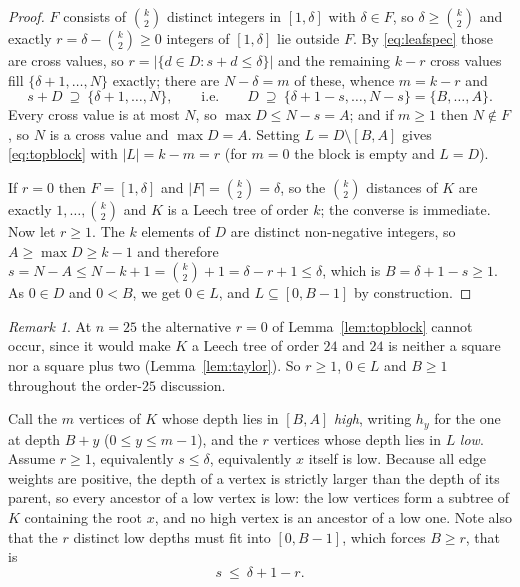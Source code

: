 \documentclass[11pt,a4paper]{article}
\theoremstyle{plain}
\theoremstyle{remark}
\newtheorem*{remark*}{Remark}
\newcommand{\bin}[2]{\binom{#1}{#2}}
\begin{document}
\begin{proof}
$F$ consists of $\bin k2$ distinct integers in $[1,\delta]$ with $\delta\in F$,
so $\delta\ge\bin k2$ and exactly $r=\delta-\bin k2\ge 0$ integers of $[1,\delta]$
lie outside $F$.  By \eqref{eq:leafspec} those are cross values, so
$r=|\{d\in D: s+d\le\delta\}|$ and the remaining $k-r$ cross values fill
$\{\delta+1,\dots,N\}$ exactly; there are $N-\delta=m$ of these, whence $m=k-r$
and
\[
  s+D\ \supseteq\ \{\delta+1,\dots,N\},\qquad\text{i.e.}\qquad
  D\ \supseteq\ \{\delta+1-s,\dots,N-s\}=\{B,\dots,A\}.
\]
Every cross value is at most $N$, so $\max D\le N-s=A$; and if $m\ge1$ then
$N\notin F$, so $N$ is a cross value and $\max D=A$.  Setting
$L=D\setminus[B,A]$ gives \eqref{eq:topblock} with $|L|=k-m=r$ (for $m=0$ the
block is empty and $L=D$).

If $r=0$ then $F=[1,\delta]$ and $|F|=\bin k2=\delta$, so the $\bin k2$
distances of $K$ are exactly $1,\dots,\bin k2$ and $K$ is a Leech tree of order
$k$; the converse is immediate.  Now let $r\ge1$.  The $k$ elements of $D$ are
distinct non-negative integers, so $A\ge\max D\ge k-1$ and therefore
$s=N-A\le N-k+1=\bin k2+1=\delta-r+1\le\delta$, which is $B=\delta+1-s\ge1$.
As $0\in D$ and $0<B$, we get $0\in L$, and $L\subseteq[0,B-1]$ by construction.
\end{proof}

\begin{remark*}
At $n=25$ the alternative $r=0$ of Lemma~\ref{lem:topblock} cannot occur, since
it would make $K$ a Leech tree of order $24$ and $24$ is neither a square nor a
square plus two (Lemma~\ref{lem:taylor}).  So $r\ge1$, $0\in L$ and $B\ge1$
throughout the order-$25$ discussion.
\end{remark*}

Call the $m$ vertices of $K$ whose depth lies in $[B,A]$ \emph{high}, writing
$h_y$ for the one at depth $B+y$ ($0\le y\le m-1$), and the $r$ vertices whose
depth lies in $L$ \emph{low}.  Assume $r\ge1$, equivalently $s\le\delta$,
equivalently $x$ itself is low.  Because all edge weights are positive, the
depth of a vertex is strictly larger than the depth of its parent, so every
ancestor of a low vertex is low: the low vertices form a subtree of $K$
containing the root $x$, and no high vertex is an ancestor of a low one.  Note
also that the $r$ distinct low depths must fit into $[0,B-1]$, which forces
$B\ge r$, that is
\begin{equation}\label{eq:sfits}
  s\ \le\ \delta+1-r .
\end{equation}
\end{document}

